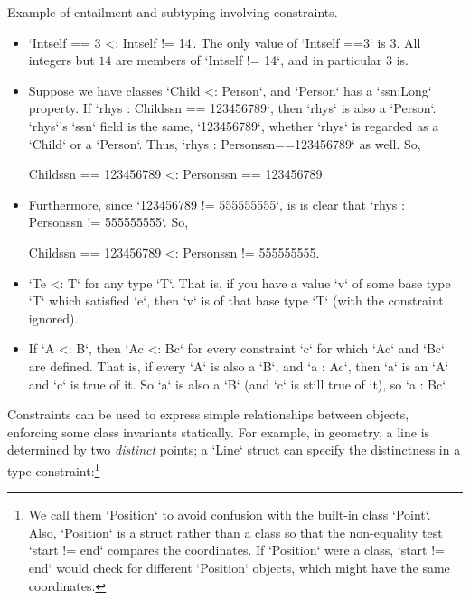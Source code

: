 Example of entailment and subtyping involving constraints.
\begin{itemize}
\item \xcd`Int{self == 3} <: Int{self != 14}`.  The only value of
      \xcd`Int{self ==3}` is $3$.  All integers but $14$ are members of
      \xcd`Int{self != 14}`, and in particular $3$ is.  
\item Suppose we have classes \xcd`Child <: Person`, and \xcd`Person` has a
      \xcd`ssn:Long` property.  If \xcd`rhys : Child{ssn == 123456789}`, then
      \xcd`rhys` is also a \xcd`Person`.  
      \xcd`rhys`'s \xcd`ssn` field is the same, \xcd`123456789`, whether 
      \xcd`rhys` is regarded as a \xcd`Child` or a \xcd`Person`.  
      Thus, 
      \xcd`rhys : Person{ssn==123456789}` as well.  
      So, 
\begin{xtenmath}
Child{ssn == 123456789} <: Person{ssn == 123456789}.
\end{xtenmath}
\item Furthermore, since \xcd`123456789 != 555555555`, 
      is is clear that 
      \xcd`rhys : Person{ssn != 555555555}`.  
      So, 
\begin{xtenmath}
Child{ssn == 123456789} <: Person{ssn != 555555555}.  
\end{xtenmath}
\item \xcd`T{e} <: T` for any type \xcd`T`.  That is, if you have a value
      \xcd`v` of some base type \xcd`T` which satisfied \xcd`e`, then \xcd`v`
      is of that base type \xcd`T` (with the constraint ignored).
\item If \xcd`A <: B`, then \xcd`A{c} <: B{c}` for every constraint \xcd`{c}`
      for which \xcd`A{c}` and \xcd`B{c}` are defined.  That is, if every
      \xcd`A` is also a \xcd`B`, and \xcd`a : A{c}`, then 
      \xcd`a` is an \xcd`A` and \xcd`c` is true of it. So \xcd`a` is also a
      \xcd`B` (and \xcd`c` is still true of 
      it), so \xcd`a : B{c}`.  
\end{itemize}

Constraints can be used to express simple relationships between objects,
enforcing some class invariants statically.  For example, in geometry, a line
is determined by two {\em distinct} points; a \xcd`Line` struct can specify the
distinctness in a type constraint:\footnote{We call them
\xcd`Position` to avoid confusion with the built-in class \xcd`Point`. 
Also, \xcd`Position` is a struct rather than a class so that the non-equality
test \xcd`start != end` compares the coordinates.  If \xcd`Position` were a
class, \xcd`start != end` would check for different \xcd`Position` objects,
which might have the same coordinates.
}


